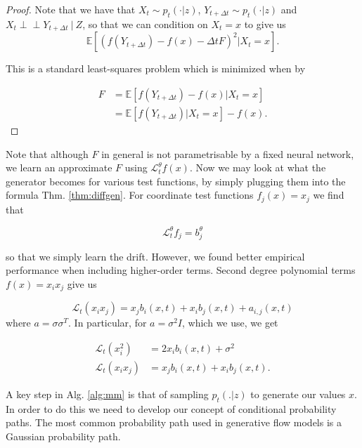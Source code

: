 \documentclass[12pt]{article}
\theoremstyle{break}
\newcommand{\indep}{\perp \!\!\! \perp}
\begin{document}
\begin{proof}
	Note that we have that $X_t \sim p_t(\cdot|z)$, $Y_{t+\Delta t} \sim p_t(\cdot|z)$ and $X_t \indep Y_{t + \Delta t} \ | \ Z$, so that we can condition on $X_t = x$ to give us
	\begin{equation}
		\mathbb{E}[(f(Y_{t+\Delta t}) - f(x) - \Delta t F)^2 | X_t = x].
	\end{equation}

	This is a standard least-squares problem which is minimized when by

	\begin{align*}
		F &= \mathbb{E}[f(Y_{t+\Delta t}) - f(x)| X_t = x] \\ 
		  &= \mathbb{E}[f(Y_{t+\Delta t}) | X_t = x] - f(x).
	\end{align*}
\end{proof}

Note that although $F$ in general is not parametrisable by a fixed neural network, we learn an approximate $F$ using $\mathcal{L}_t^\theta f(x)$. 
Now we may look at what the generator becomes for various test functions, by simply plugging them into the formula Thm. \ref{thm:diffgen}. For coordinate test functions $f_j(x) = x_j$ we find that

\begin{equation}
	\mathcal{L}_t^\theta f_j = b_j^\theta
\end{equation}

so that we simply learn the drift. However, we found better empirical performance when including higher-order terms. Second degree polynomial terms $f(x) = x_i x_j$ give us

\begin{equation}
	\mathcal{L}_t (x_i x_j) = x_jb_i(x, t) +  x_i b_j(x,t) + a_{i,j}(x, t)
\end{equation}
where $a = \sigma \sigma^T$. In particular, for $a = \sigma^2 I$, which we use, we get

\begin{align*}
	\mathcal{L}_t(x_i^2) &= 2x_ib_i(x,t) + \sigma^2 \\
	\mathcal{L}_t(x_i x_j) &= x_j b_i(x,t) + x_i b_j(x, t).
\end{align*}

A key step in Alg. \ref{alg:mm} is that of sampling $p_t(.|z)$ to generate our values $x$. In order to do this we need to develop our concept of conditional probability paths. The most common probability path used in generative flow models is a Gaussian probability path.
\end{document}
